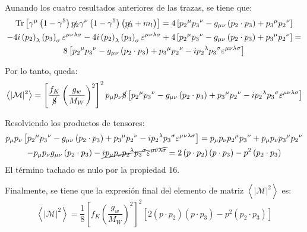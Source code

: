 Aunando los cuatro resultados anteriores de las trazas, se tiene que:
\begin{multline}
\operatorname{Tr} \left[ \gamma^{\mu } \left(1 -\gamma ^{5}\right) \slashed{p_{2}}\gamma^{\nu }\left( 1-\gamma ^{5}\right) \left( \slashed{p_{3}}+m_{l}\right) \right] = 4\left[{p_{2}}^{\mu }{ p_{3}}^{\nu }-g_{\mu \nu }\left( p_{2}\cdot p_{3}\right) +{p_{3}}^{\mu } {p_{2}}^{\nu }\right] \\ -4i\left( p_{2}\right) _{\lambda }\left( p_{3}\right) _{\sigma }\varepsilon ^{\mu \nu \lambda \sigma} -4i\left( p_{2}\right) _{\lambda }\left( p_{3}\right) _{\sigma }\varepsilon ^{\mu \nu \lambda \sigma} + 4\left[{p_{2}}^{\mu }{ p_{3}}^{\nu }-g_{\mu \nu }\left( p_{2}\cdot p_{3}\right) +{p_{3}}^{\mu } {p_{2}}^{\nu }\right] = \\ 8\left[{p_{2}}^{\mu }{ p_{3}}^{\nu }-g_{\mu \nu }\left( p_{2}\cdot p_{3}\right) +{p_{3}}^{\mu } {p_{2}}^{\nu } -i{p_{2}}^{\lambda} {{p_{3}}}^{\sigma} \varepsilon^{  \mu \nu \lambda \sigma} \right]
\end{multline}

Por lo tanto, queda:
\begin{equation}
\left\langle |\mathcal{M}|^{2}\right\rangle=\left[ \dfrac{f_{K}}{\cancel{8}}\left( \dfrac{g_w}{M_W}\right)^{2}\right]^{2} p_{\mu }p_{\nu}\cancel{8}\left[{p_{2}}^{\mu }{ p_{3}}^{\nu }-g_{\mu \nu }\left( p_{2}\cdot p_{3}\right) +{p_{3}}^{\mu } {p_{2}}^{\nu } -i{p_{2}}^{\lambda} {{p_{3}}}^{\sigma} \varepsilon^{  \mu \nu \lambda \sigma} \right]
\end{equation}

Resolviendo los productos de tensores:
\begin{multline}
p_{\mu }p_{\nu}\left[{p_{2}}^{\mu }{ p_{3}}^{\nu }-g_{\mu \nu }\left( p_{2}\cdot p_{3}\right) +{p_{3}}^{\mu } {p_{2}}^{\nu } -i{p_{2}}^{\lambda} {{p_{3}}}^{\sigma} \varepsilon^{  \mu \nu \lambda \sigma} \right] =  p_{\mu }p_{\nu}{p_{2}}^{\mu }{ p_{3}}^{\nu } + p_{\mu }p_{\nu}{p_{3}}^{\mu } {p_{2}}^{\nu } \\ - p_{\mu }p_{\nu}g_{\mu \nu }\left( p_{2}\cdot p_{3}\right)- \cancel{i p_{\mu }p_{\nu}{p_{2}}^{\lambda} {{p_{3}}}^{\sigma} \varepsilon^{  \mu \nu \lambda \sigma}} = 2\left( p\cdot p_{2}\right) \left( p\cdot p_{3}\right) -p^{2}\left( p_{2}\cdot p_{3}\right)
\end{multline}
El término tachado es nulo por la propiedad 16.

Finalmente, se tiene que la expresión final del elemento de matriz $\left\langle |\mathcal{M}|^{2}\right\rangle$ es:
\begin{equation}
\left\langle |\mathcal{M}|^{2}\right\rangle=\dfrac{1}{8}\left[ f_{K}\left( \dfrac{g_w}{M_W}\right) ^{2}\right] ^{2}\left[2\left( p\cdot p_{2}\right) \left( p\cdot p_{3}\right) -p^{2}\left( p_{2}\cdot p_{3}\right)\right]\label{eq:elementomatrix}
\end{equation}

